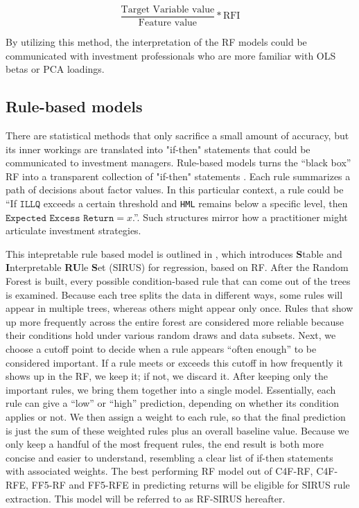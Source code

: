 \begin{equation}
    \label{eq:psuedo}
    \frac{\text{Target Variable value}}{\text{{Feature value}}}* \text{RFI}
\end{equation}

By utilizing this method, the interpretation of the RF models could be communicated with investment professionals who are more familiar with OLS betas or PCA loadings.

\subsection{Rule-based models}
There are statistical methods that only sacrifice a small amount of accuracy, but its inner workings are translated into "if-then" statements that could be communicated to investment managers. Rule-based models turns the “black box” RF into a transparent collection of "if-then" statements \cite{benard_2021}. Each rule summarizes a path of decisions about factor values. In this particular context, a rule could be “If $\texttt{ILLQ}$ exceeds a certain threshold and \texttt{HML} remains below a specific level, then $\texttt{Expected Excess Return} = x$.”. Such structures mirror how a practitioner might articulate investment strategies.

This intepretable rule based model is outlined in , which introduces \textbf{S}table and \textbf{I}nterpretable \textbf{RU}le \textbf{S}et (SIRUS) for regression, based on RF. After the Random Forest is built, every possible condition-based rule that can come out of the trees is examined. Because each tree splits the data in different ways, some rules will appear in multiple trees, whereas others might appear only once. Rules that show up more frequently across the entire forest are considered more reliable because their conditions hold under various random draws and data subsets. Next, we choose a cutoff point to decide when a rule appears “often enough” to be considered important. If a rule meets or exceeds this cutoff in how frequently it shows up in the RF, we keep it; if not, we discard it. After keeping only the important rules, we bring them together into a single model. Essentially, each rule can give a “low” or “high” prediction, depending on whether its condition applies or not. We then assign a weight to each rule, so that the final prediction is just the sum of these weighted rules plus an overall baseline value. Because we only keep a handful of the most frequent rules, the end result is both more concise and easier to understand, resembling a clear list of if-then statements with associated weights. The best performing RF model out of C4F-RF, C4F-RFE, FF5-RF and FF5-RFE in predicting returns will be eligible for SIRUS rule extraction. This model will be referred to as RF-SIRUS hereafter.
 

